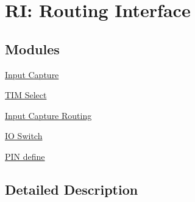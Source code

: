 \hypertarget{group___r_i___constants}{\section{R\-I\-: Routing Interface}
\label{group___r_i___constants}
}
\subsection*{Modules}
\begin{DoxyCompactItemize}
\item 
\hyperlink{group___r_i___input_capture}{Input Capture}
\item 
\hyperlink{group___t_i_m___select}{T\-I\-M Select}
\item 
\hyperlink{group___r_i___input_capture_routing}{Input Capture Routing}
\item 
\hyperlink{group___r_i___i_o_switch}{I\-O Switch}
\item 
\hyperlink{group___r_i___pin}{P\-I\-N define}
\end{DoxyCompactItemize}


\subsection{Detailed Description}
